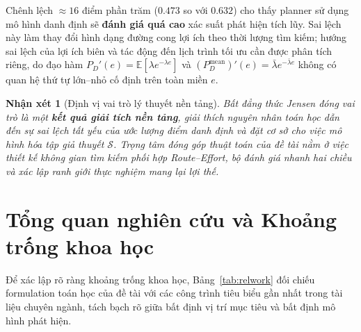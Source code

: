 \documentclass[12pt,a4paper]{article}
\newtheorem{remark}{Nhận xét}
\begin{document}
Chênh lệch $\approx 16$ điểm phần trăm ($0.473$ so với $0.632$) cho thấy planner sử dụng mô hình danh định sẽ \textbf{đánh giá quá cao} xác suất phát hiện tích lũy. Sai lệch này làm thay đổi hình dạng đường cong lợi ích theo thời lượng tìm kiếm; hướng sai lệch của lợi ích biên và tác động đến lịch trình tối ưu cần được phân tích riêng, do đạo hàm $P_D'(e) = \mathbb{E}[\lambda e^{-\lambda e}]$ và $(P_D^{\mathrm{mean}})'(e) = \bar\lambda e^{-\bar\lambda e}$ không có quan hệ thứ tự lớn--nhỏ cố định trên toàn miền $e$.

\begin{remark}[Định vị vai trò lý thuyết nền tảng]
Bất đẳng thức Jensen đóng vai trò là một \textbf{kết quả giải tích nền tảng}, giải thích nguyên nhân toán học dẫn đến sự sai lệch tất yếu của ước lượng điểm danh định và đặt cơ sở cho việc mô hình hóa tập giả thuyết $\mathcal{S}$. Trọng tâm đóng góp thuật toán của đề tài nằm ở việc thiết kế không gian tìm kiếm phối hợp Route--Effort, bộ đánh giá nhanh hai chiều và xác lập ranh giới thực nghiệm mang lại lợi thế.
\end{remark}

\section{Tổng quan nghiên cứu và Khoảng trống khoa học}

Để xác lập rõ ràng khoảng trống khoa học, Bảng~\ref{tab:relwork} đối chiếu formulation toán học của đề tài với các công trình tiêu biểu gần nhất trong tài liệu chuyên ngành, tách bạch rõ giữa bất định vị trí mục tiêu và bất định mô hình phát hiện.
\end{document}
